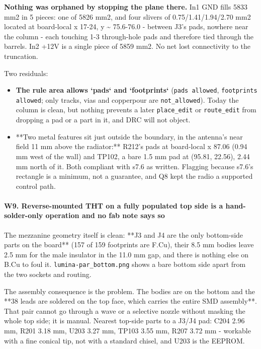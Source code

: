 \documentclass[11pt,a4paper]{article}
\begin{document}
\textbf{Nothing was orphaned by stopping the plane there.} In1 GND fills 5833 mm2 in 5 pieces: one of 5826 mm2, and four slivers of 0.75/1.41/1.94/2.70 mm2 located at board-local x 17-24, y \textasciitilde{} 75.6-76.0 - between J3's pads, nowhere near the column - each touching 1-3 through-hole pads and therefore tied through the barrels. In2 +12V is a single piece of 5859 mm2. No net lost connectivity to the truncation.

Two residuals:

\begin{itemize}
\item \textbf{The rule area allows `pads` and `footprints`} (\texttt{pads allowed},
\texttt{footprints allowed}; only tracks, vias and copperpour are \texttt{not\_allowed}).
Today the column is clean, but nothing prevents a later \texttt{place\_edit} or
\texttt{route\_edit} from dropping a pad or a part in it, and DRC will not object.
\item {*}{*}Two metal features sit just outside the boundary, in the antenna's near
field 11 mm above the radiator:{*}{*} R212's pads at board-local x 87.06
(0.94 mm west of the wall) and TP102, a bare 1.5 mm pad at (95.81, 22.56),
2.44 mm north of it. Both compliant with s7.6 as written. Flagging because
s7.6's rectangle is a minimum, not a guarantee, and Q8 kept the radio a
supported control path.
\end{itemize}
\paragraph*{W9. Reverse-mounted THT on a fully populated top side is a hand-solder-only operation and no fab note says so}
The mezzanine geometry itself is clean: {*}{*}J3 and J4 are the only bottom-side parts on the board{*}{*} (157 of 159 footprints are F.Cu), their 8.5 mm bodies leave 2.5 mm for the male insulator in the 11.0 mm gap, and there is nothing else on B.Cu to foul it. \texttt{lumina-par\_bottom.png} shows a bare bottom side apart from the two sockets and routing.

The assembly consequence is the problem. The bodies are on the bottom and the {*}{*}38 leads are soldered on the top face, which carries the entire SMD assembly{*}{*}. That pair cannot go through a wave or a selective nozzle without masking the whole top side; it is manual. Nearest top-side parts to a J3/J4 pad: C204 2.96 mm, R201 3.18 mm, U203 3.27 mm, TP103 3.55 mm, R207 3.72 mm - workable with a fine conical tip, not with a standard chisel, and U203 is the EEPROM.
\end{document}
